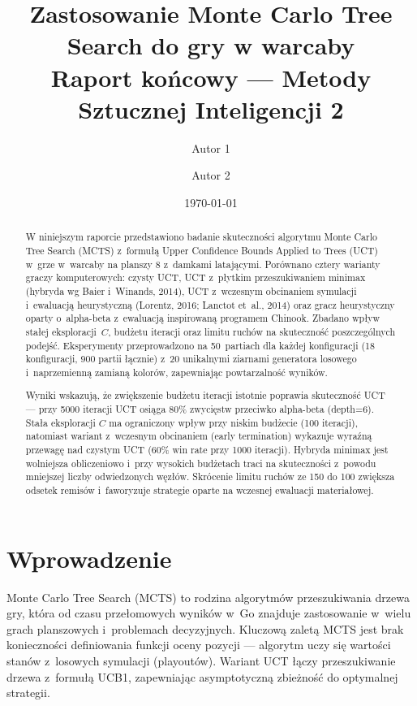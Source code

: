 \documentclass[12pt,a4paper]{article}
\title{Zastosowanie Monte Carlo Tree Search do gry w warcaby \\[0.5em]
\large Raport końcowy — Metody Sztucznej Inteligencji 2}
\author{
  Autor 1 \and Autor 2
}
\date{\today}
\begin{document}
\maketitle

\begin{abstract}
W niniejszym raporcie przedstawiono badanie skuteczności algorytmu Monte Carlo Tree Search (MCTS) z~formułą Upper Confidence Bounds Applied to Trees (UCT) w~grze w~warcaby na planszy 8 z~damkami latającymi. Porównano cztery warianty graczy komputerowych: czysty UCT, UCT z~płytkim przeszukiwaniem minimax (hybryda wg Baier i~Winands, 2014), UCT z~wczesnym obcinaniem symulacji i~ewaluacją heurystyczną (Lorentz, 2016; Lanctot et~al., 2014) oraz gracz heurystyczny oparty o~alpha-beta z~ewaluacją inspirowaną programem Chinook. Zbadano wpływ stałej eksploracji~$C$, budżetu iteracji oraz limitu ruchów na skuteczność poszczególnych podejść. Eksperymenty przeprowadzono na 50~partiach dla każdej konfiguracji (18 konfiguracji, 900 partii łącznie) z~20 unikalnymi ziarnami generatora losowego i~naprzemienną zamianą kolorów, zapewniając powtarzalność wyników.

Wyniki wskazują, że zwiększenie budżetu iteracji istotnie poprawia skuteczność UCT — przy 5000 iteracji UCT osiąga 80\% zwycięstw przeciwko alpha-beta (depth=6). Stała eksploracji $C$ ma ograniczony wpływ przy niskim budżecie (100 iteracji), natomiast wariant z~wczesnym obcinaniem (early termination) wykazuje wyraźną przewagę nad czystym UCT (60\% win rate przy 1000 iteracji). Hybryda minimax jest wolniejsza obliczeniowo i~przy wysokich budżetach traci na skuteczności z~powodu mniejszej liczby odwiedzonych węzłów. Skrócenie limitu ruchów ze 150 do 100 zwiększa odsetek remisów i~faworyzuje strategie oparte na wczesnej ewaluacji materiałowej.
\end{abstract}

\section{Wprowadzenie}
\label{sec:intro}

Monte Carlo Tree Search (MCTS) to rodzina algorytmów przeszukiwania drzewa gry, która od czasu przełomowych wyników w~Go \cite{silver2016mastering} znajduje zastosowanie w~wielu grach planszowych i~problemach decyzyjnych. Kluczową zaletą MCTS jest brak konieczności definiowania funkcji oceny pozycji — algorytm uczy się wartości stanów z~losowych symulacji (playoutów). Wariant UCT \cite{kocsis2006bandit} łączy przeszukiwanie drzewa z~formułą UCB1, zapewniając asymptotyczną zbieżność do optymalnej strategii.
\end{document}
